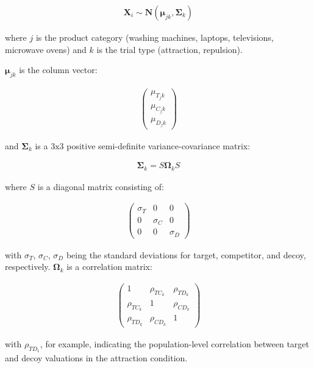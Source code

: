 \begin{align}
    \textbf{X}_{i}\sim \mathcal{\textbf{N}}(\boldsymbol{\mu}_{jk},\boldsymbol{\Sigma}_{k})
\end{align}

where $j$ is the product category (washing machines, laptops, televisions, microwave ovens) and $k$ is the trial type (attraction, repulsion). 

$\boldsymbol{\mu}_{jk}$ is the column vector:

\begin{align}
   \begin{pmatrix}
      \mu_{T_jk} \\
      \mu_{C_jk} \\
      \mu_{D_jk}
      \end{pmatrix}
   \label{eqn:mu_price}
\end{align}

and $\boldsymbol{\Sigma}_{k}$ is a $3\text{x}3$ positive semi-definite variance-covariance matrix:

\begin{align}
   \boldsymbol{\Sigma}_{k}=S\boldsymbol{\Omega}_{k}S
\end{align}

where $S$ is a diagonal matrix consisting of: 

\begin{align}
   \begin{pmatrix}
      \sigma_{T} & 0 & 0 \\
      0 & \sigma_{C} & 0 \\
      0 & 0 & \sigma_{D} 
   \end{pmatrix}
\end{align}

with $\sigma_{T}$, $\sigma_{C}$, $\sigma_{D}$ being the standard deviations for target, competitor, and decoy, respectively. $\boldsymbol{\Omega}_{k}$ is a correlation matrix:

\begin{align}
   \begin{pmatrix}
      1 & \rho_{TC_k} & \rho_{TD_k} \\
      \rho_{TC_k} & 1 & \rho_{CD_k} \\
      \rho_{TD_k} & \rho_{CD_k} & 1 
   \end{pmatrix}
\end{align}

with $\rho_{TD_1}$, for example, indicating the population-level correlation between target and decoy valuations in the attraction condition.

